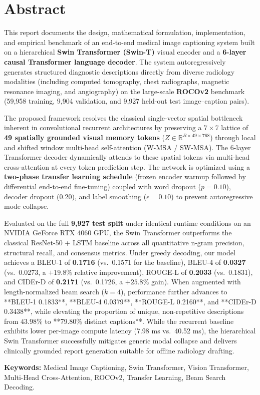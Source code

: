 \chapter*{Abstract}

This report documents the design, mathematical formulation, implementation, and empirical benchmark of an end-to-end medical image captioning system built on a hierarchical \textbf{Swin Transformer (Swin-T)} visual encoder and a \textbf{6-layer causal Transformer language decoder}. The system autoregressively generates structured diagnostic descriptions directly from diverse radiology modalities (including computed tomography, chest radiographs, magnetic resonance imaging, and angiography) on the large-scale \textbf{ROCOv2} benchmark (59,958 training, 9,904 validation, and 9,927 held-out test image--caption pairs).

The proposed framework resolves the classical single-vector spatial bottleneck inherent in convolutional recurrent architectures by preserving a $7 \times 7$ lattice of \textbf{49 spatially grounded visual memory tokens} ($Z \in \mathbb{R}^{B \times 49 \times 768}$) through local and shifted window multi-head self-attention (W-MSA / SW-MSA). The 6-layer Transformer decoder dynamically attends to these spatial tokens via multi-head cross-attention at every token prediction step. The network is optimized using a \textbf{two-phase transfer learning schedule} (frozen encoder warmup followed by differential end-to-end fine-tuning) coupled with word dropout ($p=0.10$), decoder dropout ($0.20$), and label smoothing ($\epsilon=0.10$) to prevent autoregressive mode collapse.

Evaluated on the full \textbf{9,927 test split} under identical runtime conditions on an NVIDIA GeForce RTX 4060 GPU, the Swin Transformer outperforms the classical ResNet-50 + LSTM baseline across all quantitative n-gram precision, structural recall, and consensus metrics. Under greedy decoding, our model achieves a BLEU-1 of \textbf{0.1716} (vs.\ 0.1571 for the baseline), BLEU-4 of \textbf{0.0327} (vs.\ 0.0273, a $+19.8\%$ relative improvement), ROUGE-L of \textbf{0.2033} (vs.\ 0.1831), and CIDEr-D of \textbf{0.2171} (vs.\ 0.1726, a $+25.8\%$ gain). When augmented with length-normalized beam search ($k=4$), performance further advances to **BLEU-1 0.1833**, **BLEU-4 0.0379**, **ROUGE-L 0.2160**, and **CIDEr-D 0.3438**, while elevating the proportion of unique, non-repetitive descriptions from $43.98\%$ to **79.80\% distinct captions**. While the recurrent baseline exhibits lower per-image compute latency (7.98 ms vs.\ 40.52 ms), the hierarchical Swin Transformer successfully mitigates generic modal collapse and delivers clinically grounded report generation suitable for offline radiology drafting.

\vspace{1em}
\noindent\textbf{Keywords:} Medical Image Captioning, Swin Transformer, Vision Transformer, Multi-Head Cross-Attention, ROCOv2, Transfer Learning, Beam Search Decoding.
